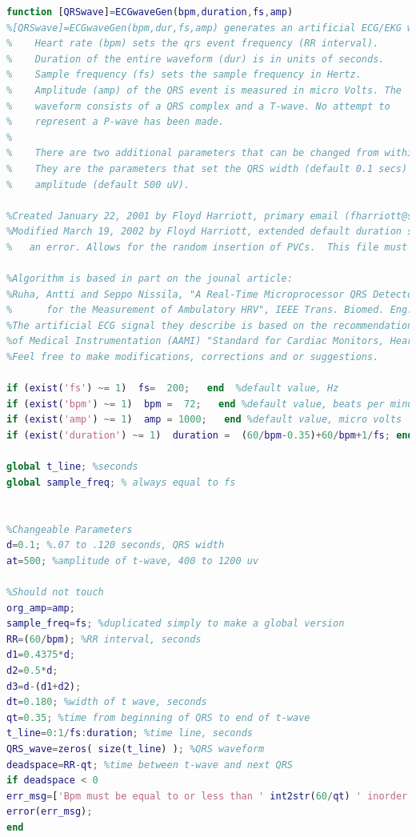 \begin{lstlisting}[language=Matlab]
function [QRSwave]=ECGwaveGen(bpm,duration,fs,amp)
%[QRSwave]=ECGwaveGen(bpm,dur,fs,amp) generates an artificial ECG/EKG waveform
%    Heart rate (bpm) sets the qrs event frequency (RR interval). 
%    Duration of the entire waveform (dur) is in units of seconds.
%    Sample frequency (fs) sets the sample frequency in Hertz. 
%    Amplitude (amp) of the QRS event is measured in micro Volts. The
%    waveform consists of a QRS complex and a T-wave. No attempt to 
%    represent a P-wave has been made.
%     
%    There are two additional parameters that can be changed from within the function.
%    They are the parameters that set the QRS width (default 0.1 secs) and the t-wave 
%    amplitude (default 500 uV).

%Created January 22, 2001 by Floyd Harriott, primary email (fharriott@stellate.com), secondary email (fsh@po.cwru.edu)
%Modified March 19, 2002 by Floyd Harriott, extended default duration so that default settings produce a QRS event rather than 
%   an error. Allows for the random insertion of PVCs.  This file must be edited to include PVCs.

%Algorithm is based in part on the jounal article:
%Ruha, Antti and Seppo Nissila, "A Real-Time Microprocessor QRS Detector System with a 1-ms Timing Accuracy
%      for the Measurement of Ambulatory HRV", IEEE Trans. Biomed. Eng. Vol. 44, No. 3, 1997
%The artificial ECG signal they describe is based on the recommendations in the Association for the Advancement
%of Medical Instrumentation (AAMI) "Standard for Cardiac Monitors, Heart Rate Meters and Alarms (draft), Aug. 1981
%Feel free to make modifications, corrections and or suggestions.

if (exist('fs') ~= 1)  fs=  200;   end  %default value, Hz
if (exist('bpm') ~= 1)  bpm =  72;   end %default value, beats per minute
if (exist('amp') ~= 1)  amp = 1000;   end %default value, micro volts
if (exist('duration') ~= 1)  duration =  (60/bpm-0.35)+60/bpm+1/fs; end  %default value gives one cycle, seconds

global t_line; %seconds
global sample_freq; % always equal to fs


%Changeable Parameters
d=0.1; %.07 to .120 seconds, QRS width
at=500; %amplitude of t-wave, 400 to 1200 uv

%Should not touch
org_amp=amp;
sample_freq=fs; %duplicated simply to make a global version
RR=(60/bpm); %RR interval, seconds
d1=0.4375*d;
d2=0.5*d;
d3=d-(d1+d2);
dt=0.180; %width of t wave, seconds
qt=0.35; %time from beginning of QRS to end of t-wave
t_line=0:1/fs:duration; %time line, seconds
QRS_wave=zeros( size(t_line) ); %QRS waveform
deadspace=RR-qt; %time between t-wave and next QRS
if deadspace < 0 
err_msg=['Bpm must be equal to or less than ' int2str(60/qt) ' inorder to fit one cycle.'];
error(err_msg); 
end



\end{lstlisting}
